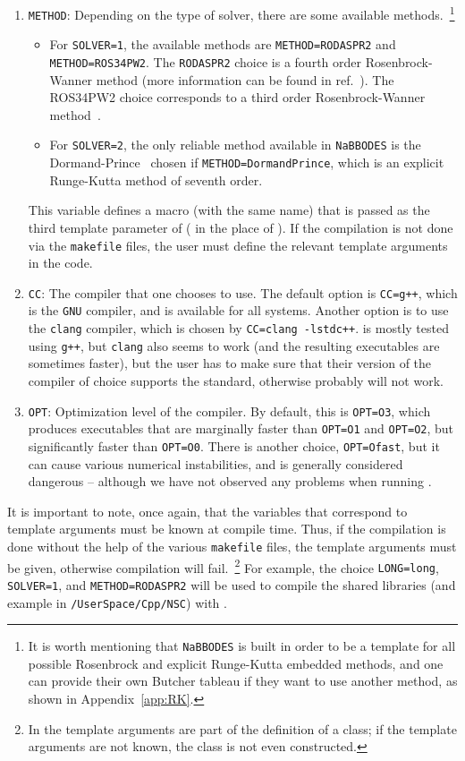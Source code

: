\documentclass[11pt,a4paper]{article}
\begin{document}
\begin{enumerate}
	\item {\tt METHOD}: Depending on the type of solver, there are some available methods.~\footnote{It is worth mentioning that {\tt NaBBODES} is built in order to be a template for all possible Rosenbrock and explicit Runge-Kutta embedded methods, and one can provide their own Butcher tableau if they want to use another method, as shown in Appendix~\ref{app:RK}.}  
	\begin{itemize}
		\item 	For {\tt SOLVER=1}, the available methods are 
		{\tt METHOD=RODASPR2} and {\tt METHOD=ROS34PW2}. The {\tt RODASPR2} choice is a fourth order Rosenbrock-Wanner method (more information can be found in ref.~\cite{RANG2015128}). The {ROS34PW2} choice corresponds to a third order Rosenbrock-Wanner method~\cite{RangAngermann2005}. 
		\item 	For {\tt SOLVER=2}, the only reliable method available in {\tt NaBBODES} is the Dormand-Prince~\cite{DORMAND198019} chosen if {\tt METHOD=DormandPrince}, which is an explicit Runge-Kutta method of seventh order.
	\end{itemize}
	This variable defines a macro (with the same name) that is passed as the third template parameter of  (\ie {} in the place of ). 
	If the compilation is not done via the {\tt makefile} files, the user must define the relevant template arguments in the code.
	\item {\tt CC}: The \CPP compiler that one chooses to use. The default option is {\tt CC=g++}, which is the {\tt GNU} \CPP compiler, and is available for all systems. Another option is to use the {\tt clang} compiler, which is chosen by {\tt CC=clang -lstdc++}. \nsc is mostly tested using {\tt g++}, but {\tt clang} also seems to work (and the resulting executables are sometimes faster), but the user has to make sure that their version of the compiler of choice supports the  standard, otherwise \nsc probably will not work.
	\item {\tt OPT}: Optimization level of the compiler. By default, this is {\tt OPT=O3}, which produces executables that are marginally faster than {\tt OPT=O1} and {\tt OPT=O2}, but significantly faster than {\tt OPT=O0}. There is another choice, {\tt OPT=Ofast}, but it can cause various numerical instabilities, and is generally considered dangerous -- although we have not observed any problems when running \nsc. 
\end{enumerate}
%
It is important to note, once again, that the variables that correspond to template arguments must be known at compile time. Thus, if the compilation is done without the help of the various {\tt makefile} files, the template arguments must be given, otherwise compilation will fail.~\footnote{In \CPP the template arguments are part of the definition of a class; if the template arguments are not known, the class is not even constructed.} For example, the choice {\tt LONG=long}, {\tt SOLVER=1}, and {\tt METHOD=RODASPR2} will be used to compile the shared libraries (and \CPP example in {\tt \nsc/UserSpace/Cpp/NSC}) with . 
\end{document}
